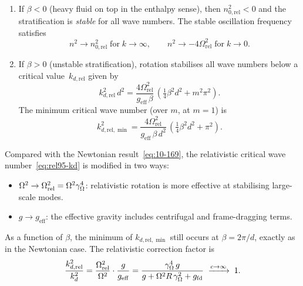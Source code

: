 \begin{enumerate}
\item If $\beta<0$ (heavy fluid on top in the enthalpy sense), then
  $n_{0,\mathrm{rel}}^{2}<0$ and the stratification is \emph{stable}
  for all wave numbers.  The stable oscillation frequency satisfies
  \begin{equation}
    n^{2}\to n_{0,\mathrm{rel}}^{2}\;\text{for}\;k\to\infty,
    \qquad
    n^{2}\to -4\Omega_{\mathrm{rel}}^{2}\;\text{for}\;k\to 0.
    \label{eq:rel95-stab-limits}
  \end{equation}

\item If $\beta>0$ (unstable stratification), rotation stabilises all
  wave numbers below a critical value~$k_{d,\mathrm{rel}}$ given by
  \begin{equation}
    \boxed{\;
    k_{d,\mathrm{rel}}^{2}\,d^{2}
      = \frac{4\Omega_{\mathrm{rel}}^{2}}
             {g_{\mathrm{eff}}\,\beta}
        \,(\tfrac{1}{4}\beta^{2}d^{2}+m^{2}\pi^{2}).\;}
    \label{eq:rel95-kd}
  \end{equation}
  The minimum critical wave number (over $m$, at $m=1$) is
  \begin{equation}
    k_{d,\mathrm{rel},\min}^{2}
      = \frac{4\Omega_{\mathrm{rel}}^{2}}
             {g_{\mathrm{eff}}\,\beta\,d^{2}}
        \,(\tfrac{1}{4}\beta^{2}d^{2}+\pi^{2}).
    \label{eq:rel95-kd-min}
  \end{equation}
\end{enumerate}

\begin{relcorrection}
Compared with the Newtonian result~\eqref{eq:10-169}, the
relativistic critical wave number~\eqref{eq:rel95-kd} is modified in
two ways:
\begin{itemize}
\item $\Omega^{2}\to\Omega_{\mathrm{rel}}^{2}
  = \Omega^{2}\gamma_{\Omega}^{4}$: relativistic rotation is more
  effective at stabilising large-scale modes.
\item $g\to g_{\mathrm{eff}}$: the effective gravity includes
  centrifugal and frame-dragging terms.
\end{itemize}
As a function of $\beta$, the minimum of $k_{d,\mathrm{rel},\min}$
still occurs at $\beta = 2\pi/d$, exactly as in the Newtonian case.
The relativistic correction factor is
\begin{equation}
  \frac{k_{d,\mathrm{rel}}^{2}}{k_{d}^{2}}
    = \frac{\Omega_{\mathrm{rel}}^{2}}{\Omega^{2}}
      \cdot\frac{g}{g_{\mathrm{eff}}}
    = \frac{\gamma_{\Omega}^{4}\,g}
           {g+\Omega^{2}R\,\gamma_{\Omega}^{2}+g_{\mathrm{fd}}}
    \;\xrightarrow{c\to\infty}\; 1.
  \label{eq:rel95-correction-ratio}
\end{equation}
\end{relcorrection}

